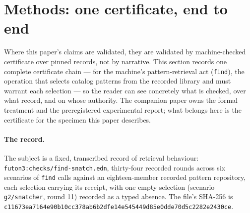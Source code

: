 \section{Methods: one certificate, end to end}\label{sec:methods}


Where this paper's claims are validated, they are validated by
machine-checked certificate over pinned records, not by narrative.  This
section records one complete certificate chain --- for the machine's
pattern-retrieval act (\texttt{find}), the operation that selects catalog
patterns from the recorded library and must warrant each selection ---
so the reader can see concretely what is checked, over what record, and
on whose authority.  The companion paper owns the formal treatment and
the preregistered experimental report; what belongs here is the
certificate for the specimen this paper describes.

\paragraph{The record.}  The subject is a fixed, transcribed record of
retrieval behaviour: \texttt{futon3:checks/find-snatch.edn}, thirty-four
recorded rounds across six scenarios of \texttt{find} calls against an
eighteen-member recorded pattern repository, each selection carrying its
receipt, with one empty selection (scenario \texttt{g2/snatcher}, round
11) recorded as a typed absence.  The file's SHA-256 is
\texttt{c11673ea7164e90b10cc378ab6b2dfe14e545449d85e0dde70d5c2282e2430ce}.

